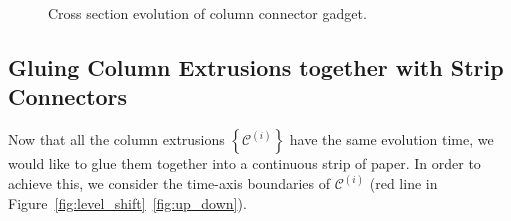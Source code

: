 \graphicspath{{./figures/}}
\begin{figure}[htb]
    \def\svgwidth{1.1\textwidth}
    \caption{
    Cross section evolution of column connector gadget.
    }
    \label{fig:connector_cross_section}
\end{figure}

\subsection{Gluing Column Extrusions together with Strip Connectors}
\label{sec:strip_connectors}

Now that all the column extrusions $\left\{ \mathcal C^{(i)} \right\}$ have the same evolution time,
we would like to glue them together into a continuous strip of paper.
In order to achieve this, we consider the time-axis boundaries of $\mathcal C^{(i)}$
(red line in Figure~\ref{fig:level_shift}~\ref{fig:up_down}).



